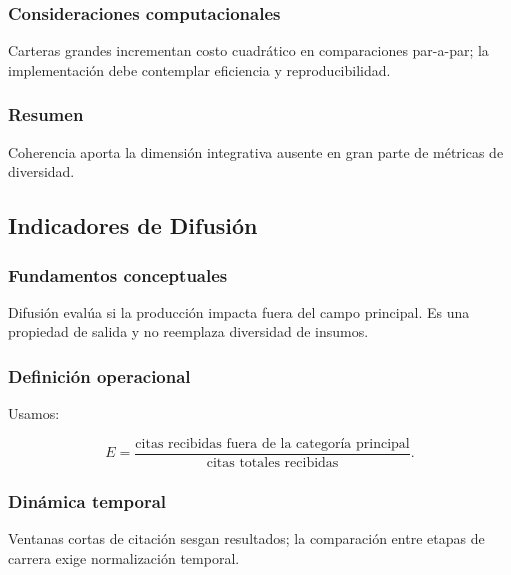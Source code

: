 \documentclass[
]{article}
\begin{document}
\hypertarget{consideraciones-computacionales}{%
\subsubsection{Consideraciones
computacionales}\label{consideraciones-computacionales}}

Carteras grandes incrementan costo cuadrático en comparaciones
par-a-par; la implementación debe contemplar eficiencia y
reproducibilidad.

\hypertarget{resumen-1}{%
\subsubsection{Resumen}\label{resumen-1}}

Coherencia aporta la dimensión integrativa ausente en gran parte de
métricas de diversidad.

\hypertarget{indicadores-de-difusiuxf3n}{%
\subsection{Indicadores de Difusión}\label{indicadores-de-difusiuxf3n}}

\hypertarget{fundamentos-conceptuales-1}{%
\subsubsection{Fundamentos
conceptuales}\label{fundamentos-conceptuales-1}}

Difusión evalúa si la producción impacta fuera del campo principal. Es
una propiedad de salida y no reemplaza diversidad de insumos.

\hypertarget{definiciuxf3n-operacional}{%
\subsubsection{Definición operacional}\label{definiciuxf3n-operacional}}

Usamos:

\[E = \frac{\text{citas recibidas fuera de la categoría principal}}{\text{citas totales recibidas}}.\]

\hypertarget{dinuxe1mica-temporal}{%
\subsubsection{Dinámica temporal}\label{dinuxe1mica-temporal}}

Ventanas cortas de citación sesgan resultados; la comparación entre
etapas de carrera exige normalización temporal.
\end{document}

